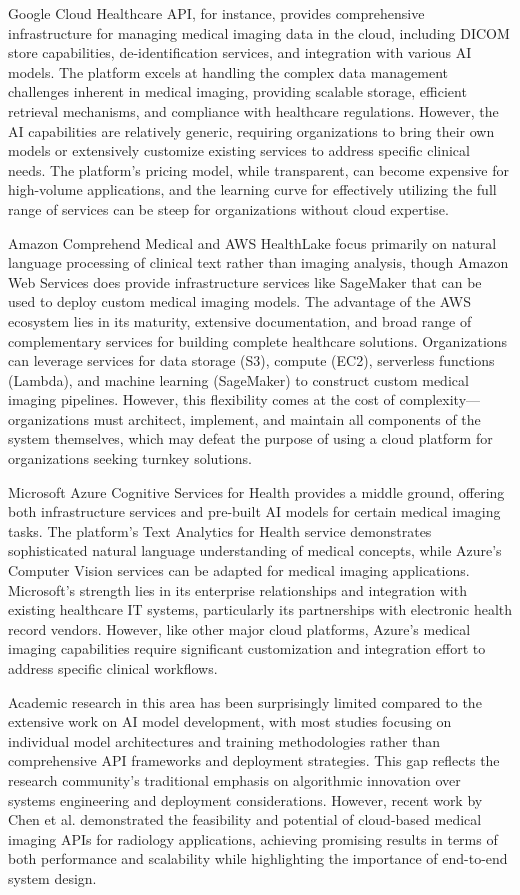 \documentclass[12pt,a4paper]{article}
\begin{document}
Google Cloud Healthcare API, for instance, provides comprehensive infrastructure for managing medical imaging data in the cloud, including DICOM store capabilities, de-identification services, and integration with various AI models. The platform excels at handling the complex data management challenges inherent in medical imaging, providing scalable storage, efficient retrieval mechanisms, and compliance with healthcare regulations. However, the AI capabilities are relatively generic, requiring organizations to bring their own models or extensively customize existing services to address specific clinical needs. The platform's pricing model, while transparent, can become expensive for high-volume applications, and the learning curve for effectively utilizing the full range of services can be steep for organizations without cloud expertise.

Amazon Comprehend Medical and AWS HealthLake focus primarily on natural language processing of clinical text rather than imaging analysis, though Amazon Web Services does provide infrastructure services like SageMaker that can be used to deploy custom medical imaging models. The advantage of the AWS ecosystem lies in its maturity, extensive documentation, and broad range of complementary services for building complete healthcare solutions. Organizations can leverage services for data storage (S3), compute (EC2), serverless functions (Lambda), and machine learning (SageMaker) to construct custom medical imaging pipelines. However, this flexibility comes at the cost of complexity—organizations must architect, implement, and maintain all components of the system themselves, which may defeat the purpose of using a cloud platform for organizations seeking turnkey solutions.

Microsoft Azure Cognitive Services for Health provides a middle ground, offering both infrastructure services and pre-built AI models for certain medical imaging tasks. The platform's Text Analytics for Health service demonstrates sophisticated natural language understanding of medical concepts, while Azure's Computer Vision services can be adapted for medical imaging applications. Microsoft's strength lies in its enterprise relationships and integration with existing healthcare IT systems, particularly its partnerships with electronic health record vendors. However, like other major cloud platforms, Azure's medical imaging capabilities require significant customization and integration effort to address specific clinical workflows.

Academic research in this area has been surprisingly limited compared to the extensive work on AI model development, with most studies focusing on individual model architectures and training methodologies rather than comprehensive API frameworks and deployment strategies. This gap reflects the research community's traditional emphasis on algorithmic innovation over systems engineering and deployment considerations. However, recent work by Chen et al. \cite{chen2021lowdose} demonstrated the feasibility and potential of cloud-based medical imaging APIs for radiology applications, achieving promising results in terms of both performance and scalability while highlighting the importance of end-to-end system design.
\end{document}
